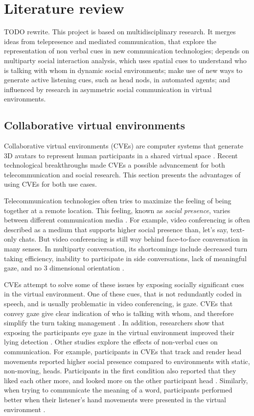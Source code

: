 \documentclass[]{simple-thesis}
\begin{document}
\chapter{Literature review}\label{literature_review}

TODO rewrite.
This project is based on multidisciplinary research.
It merges ideas from telepresence and mediated communication, that explore the representation of non verbal cues in new communication technologies;
depends on multiparty social interaction analysis, which uses spatial cues to understand who is talking with whom in dynamic social environments;
make use of new ways to generate active listening cues, such as head nods, in automated agents;
and influenced by research in asymmetric social communication in virtual environments.

\section{Collaborative virtual environments}

Collaborative virtual environments (CVEs) are computer systems that generate 3D avatars to represent human participants in a shared virtual space \cite{Bailenson2004}.
Recent technological breakthroughs made CVEs a possible advancement for both telecommunication and social research.
This section presents the advantages of using CVEs for both use cases.

Telecommunication technologies often tries to maximize the feeling of being together at a remote location.
This feeling, known as \textit{social presence}, varies between different communication media \citep{Short1976}.
For example, video conferencing is often described as a medium that supports higher social presence than, let's say, text-only chats.
But video conferencing is still way behind face-to-face conversation in many senses.
In multiparty conversation, its shortcomings include decreased turn taking efficiency, inability to participate in side conversations, lack of meaningful gaze, and no 3 dimensional orientation \citep{Isaacs1994}.

CVEs attempt to solve some of these issues by exposing socially significant cues in the virtual environment.
One of these cues, that is not redundantly coded in speech, and is usually problematic in video conferencing, is gaze.
CVEs that convey gaze give clear indication of who is talking with whom, and therefore simplify the turn taking management \citep{Vertegaal1999, Vertegaal2003}.
In addition, researchers show that exposing the participants eye gaze in the virtual environment improved their lying detection \citep{Steptoe2010}.
Other studies explore the effects of non-verbal cues on communication.
For example, participants in CVEs that track and render head movements reported higher social presence compared to environments with static, non-moving, heads.
Participants in the first condition also reported that they liked each other more, and looked more on the other participant head \citep{Bailenson2002}.
Similarly, when trying to communicate the meaning of a word, participants performed better when their listener's hand movements were presented in the virtual environment \citep{Dodds2011}.
\end{document}
